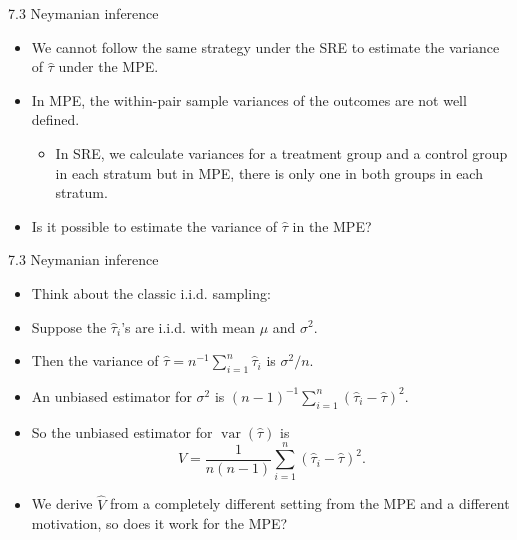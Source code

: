 \documentclass[aspectratio=169, 12pt]{beamer}
\begin{document}
\begin{frame}{7.3 Neymanian inference}
    \begin{itemize}
        \item We cannot follow the same strategy under the SRE to estimate the variance of $\hat{\tau}$ under the MPE.
        \item In MPE, the within-pair sample variances of the outcomes are not well defined.
        \begin{itemize}
            \item In SRE, we calculate variances for a treatment group and a control group in each stratum but in MPE, there is only one in both groups in each stratum.
        \end{itemize}
        \item Is it possible to estimate the variance of $\hat{\tau}$ in the MPE?
    \end{itemize}
\end{frame}

\begin{frame}{7.3 Neymanian inference}
    \begin{itemize}
        \item Think about the classic i.i.d. sampling:
        \item Suppose the $\hat{\tau}_i$'s are i.i.d. with mean $\mu$ and $\sigma^2$.
        \item Then the variance of $\hat{\tau}=n^{-1}\sum_{i=1}^{n}\hat{\tau}_i$ is $\sigma^2/n$.
        \item An unbiased estimator for $\sigma^2$ is $(n-1)^{-1}\sum_{i=1}^{n}(\hat{\tau}_i-\hat{\tau})^2$.  
        \item So the unbiased estimator for $\operatorname{var}(\hat{\tau})$ is 
        \begin{equation}
            \widehat{V}= \frac{1}{n(n-1)}\sum_{i=1}^{n}(\hat{\tau}_i-\hat{\tau})^2.
            \label{variance-estimator-mpe}
        \end{equation}

        \item We derive $\widehat{V}$ from a completely different setting from the MPE and a different motivation, so does it work for the MPE?
    \end{itemize}
\end{frame}
\end{document}
